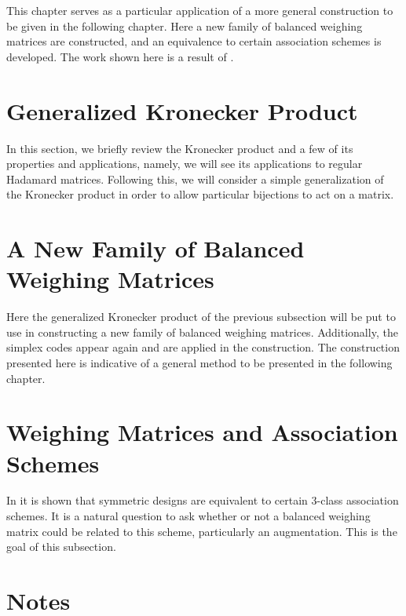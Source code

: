 \documentclass[../../main]{subfiles}
\begin{document}
This chapter serves as a particular application of a more general construction to be given in the following chapter. Here a new family of balanced weighing matrices are constructed, and an equivalence to certain association schemes is developed. The work shown here is a result of \cite{new-bw}.

 \section{\centering Generalized Kronecker Product}
 
 In this section, we briefly review the Kronecker product and a few of its properties and applications, namely, we will see its applications to regular Hadamard matrices. Following this, we will consider a simple generalization of the Kronecker product in order to allow particular bijections to act on a matrix.
 
 \dinkus
 
 
 
 \section{\centering A New Family of Balanced Weighing Matrices}
 
 Here the generalized Kronecker product of the previous subsection will be put to use in constructing a new family of balanced weighing matrices. Additionally, the simplex codes appear again and are applied in the construction. The construction presented here is indicative of a general method to be presented in the following chapter.
 
 \dinkus
 
 
 
 \section{\centering Weighing Matrices and Association Schemes}
 
 In \cite{distance-regular-graphs} it is shown that symmetric designs are equivalent to certain 3-class association schemes. It is a natural question to ask whether or not a balanced weighing matrix could be related to this scheme, particularly an augmentation. This is the goal of this subsection.
 
 \dinkus
 
 
 
 \singlespace
 
 \section*{\centering Notes}
 \theenotes
 
 \doublespacing
 
 \biblio
\end{document}

